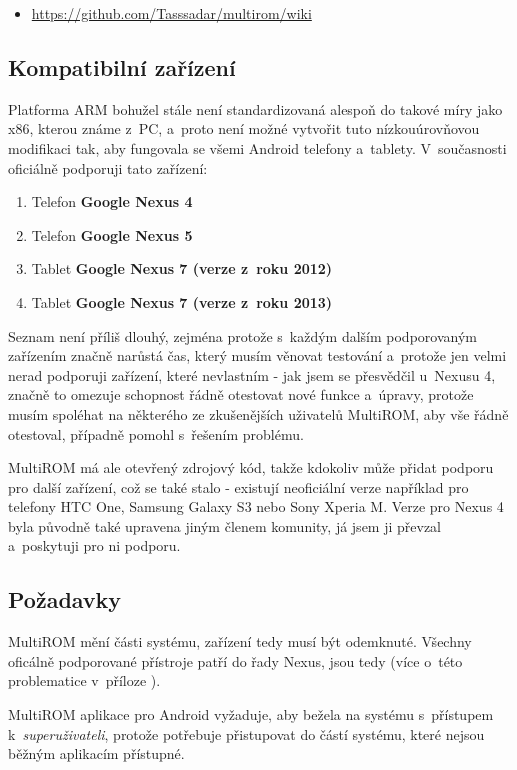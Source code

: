 \documentclass[12pt, a4paper, oneside]{article}
\newcommand{\B}{\textbf} %
\newcommand{\It}{\textit}  %
\begin{document}
\begin{itemize}
\item \url{https://github.com/Tasssadar/multirom/wiki}
\end{itemize}

\subsection{Kompatibilní zařízení}
Platforma ARM bohužel stále není standardizovaná alespoň do takové míry jako x86, kterou známe z~PC, a~proto není možné vytvořit tuto nízkouúrovňovou modifikaci tak, aby fungovala se všemi Android telefony a~tablety. V~současnosti oficiálně podporuji tato zařízení:

\begin{enumerate}
    \item Telefon \B{Google Nexus 4}
    \item Telefon \B{Google Nexus 5}
    \item Tablet \B{Google Nexus 7 (verze z~roku 2012)}
    \item Tablet \B{Google Nexus 7 (verze z~roku 2013)}
\end{enumerate}

Seznam není příliš dlouhý, zejména protože s~každým dalším podporovaným zařízením značně narůstá čas, který musím věnovat testování a~protože jen velmi nerad podporuji zařízení, které nevlastním - jak jsem se přesvědčil u~Nexusu 4, značně to omezuje schopnost řádně otestovat nové funkce a~úpravy, protože musím spoléhat na některého ze zkušenějších uživatelů MultiROM, aby vše řádně otestoval, případně pomohl s~řešením problému.

MultiROM má ale otevřený zdrojový kód, takže kdokoliv může přidat podporu pro další zařízení, což se také stalo - existují neoficiální verze například pro telefony HTC One, Samsung Galaxy S3 nebo Sony Xperia M. Verze pro Nexus 4 byla původně také upravena jiným členem komunity, já jsem ji převzal a~poskytuji pro ni podporu.

\subsection{Požadavky}
MultiROM mění části systému, zařízení tedy musí být odemknuté. Všechny oficálně podporované přístroje patří do řady Nexus, jsou tedy  (více o~této problematice v~příloze ).

MultiROM aplikace pro Android vyžaduje, aby bežela na systému s~přístupem k~\It{superuživateli}, protože potřebuje přistupovat do částí systému, které nejsou běžným aplikacím přístupné.
\end{document}

